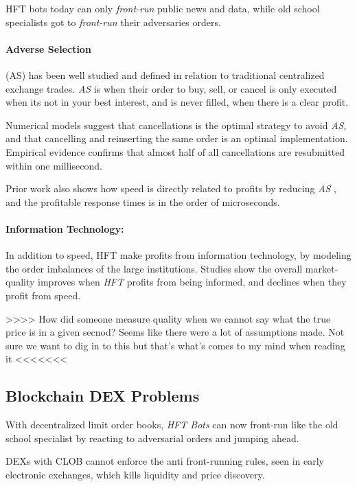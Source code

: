 \documentclass[12pt]{article}
\begin{document}
HFT bots today can only \emph{front-run} public news and data, while old school specialists got to \emph{front-run} their adversaries orders. 

\paragraph{Adverse Selection} (AS) has been well studied and defined in relation to traditional centralized exchange trades. \emph{AS} is when their order to buy, sell, or cancel is only executed when its not in your best interest, and is never filled, when there is a clear profit. 

Numerical models suggest that cancellations is the optimal strategy to avoid \emph{AS}, and that cancelling and reinserting the same order is an optimal implementation. \cite{Lehalle}  Empirical evidence confirms that almost half of all cancellations are resubmitted within one millisecond. \cite{Menkveld2} 

Prior work also shows how speed is directly related to profits by reducing \emph{AS} \cite{Lehalle},  and the profitable response times is in the order of microseconds. \cite{Menkveld2} 

\paragraph{Information Technology:} In addition to speed, HFT make profits from information technology, by modeling the order imbalances of the large institutions. Studies show the overall market-quality improves when \emph{HFT} profits from being informed, and declines when they profit from speed. \cite{Menkveld2}

>>>> How did someone measure quality when we cannot say what the true price is in a given secnod? Seems like there were a lot of assumptions made. Not sure we want to dig in to this but that's what's comes to my mind when reading it <<<<<<<

 
\subsection*{Blockchain DEX Problems}

With decentralized limit order books, \emph{HFT Bots} can now front-run like the old school specialist by reacting to adversarial orders and jumping ahead. 

DEXs with CLOB cannot enforce the anti front-running rules, seen in early electronic exchanges, which kills liquidity and price discovery. 
\end{document}
